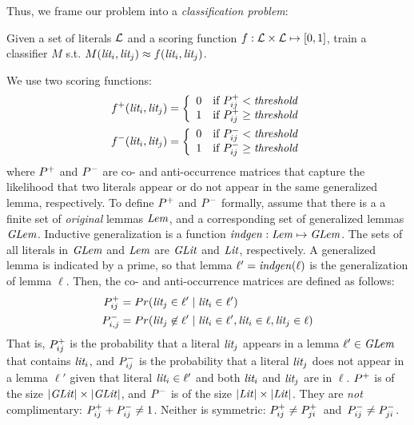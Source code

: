 Thus, we frame our problem into a \emph{classification problem}:
\begin{problem}
Given a set of literals $\mathcal{L}$ and a scoring function $f: \mathcal{L} \times \mathcal{L} \mapsto [0,1]$, 
train a classifier $M$ %
s.t. $M(\textit{lit}_i,\textit{lit}_j) \approx f(\textit{lit}_i, \textit{lit}_j)$.
\end{problem}
We use two scoring functions:
{\small\begin{align*}
    f^{+}(\textit{lit}_i, \textit{lit}_j) &=
    \left\{ \begin{array}{ll}  0  & \mbox{if } P^+_{ij} < \textit{threshold} \\  1  & \mbox{if } P^+_{ij} \geq \textit{threshold} \end{array} \right. \\
    f^{-}(\textit{lit}_i, \textit{lit}_j) &=
    \left\{ \begin{array}{ll}  0  & \mbox{if } P^-_{ij} < \textit{threshold} \\  1  & \mbox{if } P^-_{ij} \geq \textit{threshold} \end{array} \right.
\end{align*}}%
where $P^+$ and $P^-$ are co- and anti-occurrence matrices that capture the likelihood that two literals appear or do not appear in the same generalized lemma, respectively.
To define $P^+$ and $P^-$ formally, assume that there is a a finite set of \emph{original} lemmas $\mathit{Lem}$, and a corresponding  set of generalized lemmas $\mathit{GLem}$. Inductive generalization is a function $\mathit{indgen}: \mathit{Lem} \mapsto \mathit{GLem}$. The sets of all literals in $\mathit{GLem}$ and $\mathit{Lem}$ are $\mathit{GLit}$ and $\mathit{Lit}$, respectively. A generalized lemma is indicated by a prime, so that lemma $\ell'=\mathit{indgen}(\ell)$ is the generalization of lemma $\ell$. Then, the co- and anti-occurrence matrices are defined as follows: 
{\small\begin{align*}
P^+_{ij} &= Pr(\textit{lit}_j \in \ell' \mid \textit{lit}_i \in \ell')\\
P^-_{i,j} &= Pr(\textit{lit}_j \not \in \ell' \mid \textit{lit}_i \in \ell', \textit{lit}_i \in \ell, \textit{lit}_j \in \ell)
\end{align*}}%
That is, $P^+_{ij}$ is the probability that a literal $\textit{lit}_j$ appears in a lemma $\ell' \in \mathit{GLem}$ that contains $\textit{lit}_i$, and $P^-_{ij}$ is the probability that a literal $\textit{lit}_j$ does not appear in a lemma $\ell'$ given that literal $\textit{lit}_i \in \ell'$ and both $\textit{lit}_i$ and $\textit{lit}_j$ are in $\ell$. $P^+$ is of the size $|\mathit{GLit}|\times|\mathit{GLit}|$, and $P^-$ is of the size $|\mathit{Lit}|\times|\mathit{Lit}|$. They are \emph{not} complimentary: \mbox{$P^+_{ij} + P^-_{ij} \neq 1$}. Neither is symmetric: \mbox{$P^+_{ij} \neq P^+_{ji}$}~and~\mbox{$P^-_{ij} \neq P^-_{ji}$}.


